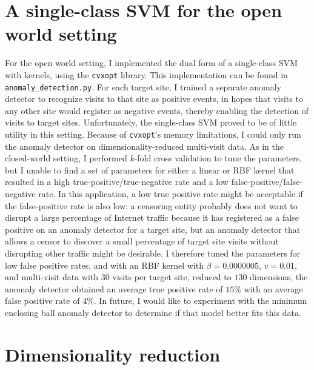 \documentclass[10pt, twocolumn]{article}
\begin{document}
\section{A single-class SVM for the open world setting}

For the open world setting, I implemented the dual form of a single-class SVM with kernels, using the 
\texttt{cvxopt} library. This implementation can be found in \texttt{anomaly\_detection.py}. For each target site, I trained 
a separate anomaly detector to recognize visits to that site as positive events, in hopes that visits to any other site 
would register as negative events, thereby enabling the detection of visits to target sites. Unfortunately, the single-class
SVM proved to be of little utility in this setting. Because of \texttt{cvxopt}'s memory limitations, I could only run the 
anomaly detector on dimensionality-reduced multi-visit data. As in the closed-world setting, I performed $k$-fold cross 
validation to tune the parameters, but I unable to find a set of parameters for either a linear or RBF kernel that resulted 
in a high true-positive/true-negative rate and a low false-positive/false-negative rate. In this application, a low true positive 
rate might be acceptable if the false-positive rate is also low: a censoring entity probably does not want to disrupt a large 
percentage of Internet traffic because it has registered as a false positive on an anomaly detector for a target site, but an 
anomaly detector that allows a censor to discover a small percentage of target site visits without disrupting other traffic 
might be desirable. I therefore tuned the parameters for low false positive rates, and with an RBF kernel with $\beta=0.0000005$, $v=0.01$, and multi-visit data with 30 visits per target site, reduced to $130$ dimensions, the anomaly detector obtained an average true positive 
rate of $15\%$ with an average false positive rate of $4\%$. In future, I would like to experiment with the minimum enclosing ball 
anomaly detector to determine if that model better fits this data.

\section{Dimensionality reduction}
\label{sec:dimred}
\end{document}
